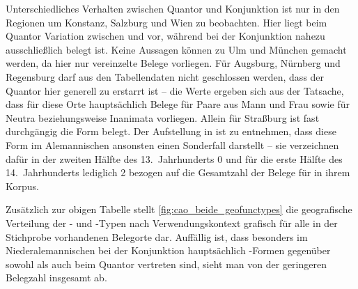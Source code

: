 Unterschiedliches Verhalten zwischen Quantor und Konjunktion ist nur in den
Regionen um Konstanz, Salzburg und Wien zu beobachten. Hier liegt beim Quantor
Variation zwischen  und  vor, während bei der
Konjunktion nahezu ausschließlich  belegt ist. Keine Aussagen
können zu Ulm und München gemacht werden, da hier nur vereinzelte Belege
vorliegen. Für Augsburg, Nürnberg und Regensburg darf aus den Tabellendaten
nicht geschlossen werden, dass der Quantor hier generell zu 
erstarrt ist -- die Werte ergeben sich aus der Tatsache, dass für diese Orte
hauptsächlich Belege für Paare aus Mann und Frau sowie für Neutra
beziehungsweise Inanimata vorliegen. Allein für Straßburg ist fast durchgängig
die Form  belegt. Der Aufstellung in \citet[621, Abb.~P~177]{ksw2}
ist zu entnehmen, dass diese Form im Alemannischen ansonsten einen Sonderfall
darstellt -- sie verzeichnen dafür in der zweiten Hälfte des 13.~Jahrhunderts
0\pct{} und für die erste Hälfte des 14.~Jahrhunderts lediglich 2\pct{} bezogen
auf die Gesamtzahl der Belege für  in ihrem Korpus.

Zusätzlich zur obigen Tabelle stellt \cref{fig:cao_beide_geofunctypes} die
geografische Verteilung der - und -Typen nach
Verwendungskontext grafisch für alle in der Stichprobe vorhandenen Belegorte
dar. Auffällig ist, dass besonders im Nieder\-alemannischen bei der Konjunktion
hauptsächlich -Formen gegenüber sowohl  als auch
 beim Quantor vertreten sind, sieht man von der geringeren
Belegzahl insgesamt ab.

